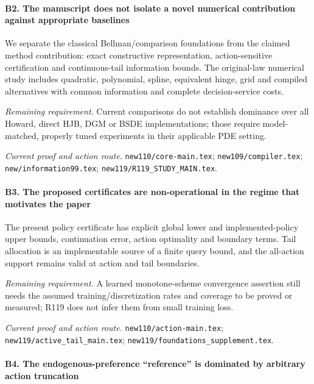 \paragraph{B2. The manuscript does not isolate a novel numerical contribution against appropriate baselines}

We separate the classical Bellman/\allowbreak{}comparison foundations from the claimed method contribution: exact constructive representation, action-sensitive certification and continuous-tail information bounds. The original-law numerical study includes quadratic, polynomial, spline, equivalent hinge, grid and compiled alternatives with common information and complete decision-service costs.

\par\emph{Remaining requirement.} Current comparisons do not establish dominance over all Howard, direct HJB, DGM or BSDE implementations; those require model-matched, properly tuned experiments in their applicable PDE setting.

\par\emph{Current proof and action route.} \nolinkurl{new110/core-main.tex}; \nolinkurl{new109/compiler.tex}; \nolinkurl{new/information99.tex}; \nolinkurl{new119/R119_STUDY_MAIN.tex}.

\paragraph{B3. The proposed certificates are non-operational in the regime that motivates the paper}

The present policy certificate has explicit global lower and implemented-policy upper bounds, continuation error, action optimality and boundary terms. Tail allocation is an implementable source of a finite query bound, and the all-action support remains valid at action and tail boundaries.

\par\emph{Remaining requirement.} A learned monotone-scheme convergence assertion still needs the assumed training/\allowbreak{}discretization rates and coverage to be proved or measured; R119 does not infer them from small training loss.

\par\emph{Current proof and action route.} \nolinkurl{new110/action-main.tex}; \nolinkurl{new119/active_tail_main.tex}; \nolinkurl{new119/foundations_supplement.tex}.

\paragraph{B4. The endogenous-preference “reference” is dominated by arbitrary action truncation}

